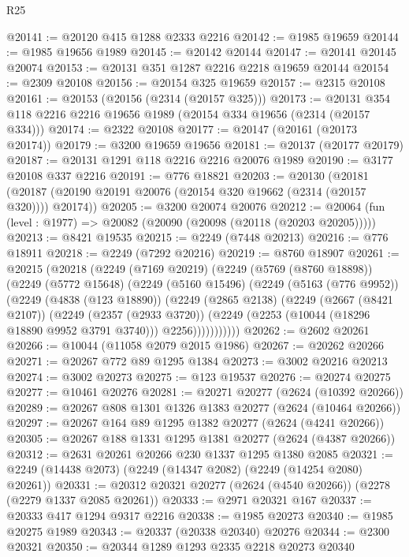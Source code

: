 \begin{lexlean}{R25}
\begin{coremodule}
@20141 := @20120 @415 @1288 @2333 @2216
@20142 := @1985 @19659
@20144 := @1985 @19656 @1989
@20145 := @20142 @20144
@20147 := @20141 @20145 @20074
@20153 := @20131 @351 @1287 @2216 @2218 @19659 @20144
@20154 := @2309 @20108
@20156 := @20154 @325 @19659
@20157 := @2315 @20108
@20161 := @20153 (@20156 (@2314 (@20157 @325)))
@20173 := @20131 @354 @118 @2216 @2216 @19656 @1989 (@20154 @334 @19656 (@2314 (@20157 @334)))
@20174 := @2322 @20108
@20177 := @20147 (@20161 (@20173 @20174))
@20179 := @3200 @19659 @19656
@20181 := @20137 (@20177 @20179)
@20187 := @20131 @1291 @118 @2216 @2216 @20076 @1989
@20190 := @3177 @20108 @337 @2216
@20191 := @776 @18821
@20203 := @20130
    (@20181 (@20187 (@20190 @20191 @20076 (@20154 @320 @19662 (@2314 (@20157 @320)))) @20174))
@20205 := @3200 @20074 @20076
@20212 := @20064 (fun (level : @1977) => @20082 (@20090 (@20098 (@20118 (@20203 @20205)))))
@20213 := @8421 @19535
@20215 := @2249 (@7448 @20213)
@20216 := @776 @18911
@20218 := @2249 (@7292 @20216)
@20219 := @8760 @18907
@20261 := @20215
    (@20218
      (@2249
        (@7169 @20219)
        (@2249
          (@5769 (@8760 @18898))
          (@2249
            (@5772 @15648)
            (@2249
              (@5160 @15496)
              (@2249
                (@5163 (@776 @9952))
                (@2249
                  (@4838 (@123 @18890))
                  (@2249
                    (@2865 @2138)
                    (@2249
                      (@2667 (@8421 @2107))
                      (@2249
                        (@2357 (@2933 @3720))
                        (@2249 (@2253 (@10044 (@18296 @18890 @9952 @3791 @3740))) @2256)))))))))))
@20262 := @2602 @20261
@20266 := @10044 (@11058 @2079 @2015 @1986)
@20267 := @20262 @20266
@20271 := @20267 @772 @89 @1295 @1384
@20273 := @3002 @20216 @20213
@20274 := @3002 @20273
@20275 := @123 @19537
@20276 := @20274 @20275
@20277 := @10461 @20276
@20281 := @20271 @20277 (@2624 (@10392 @20266))
@20289 := @20267 @808 @1301 @1326 @1383 @20277 (@2624 (@10464 @20266))
@20297 := @20267 @164 @89 @1295 @1382 @20277 (@2624 (@4241 @20266))
@20305 := @20267 @188 @1331 @1295 @1381 @20277 (@2624 (@4387 @20266))
@20312 := @2631 @20261 @20266 @230 @1337 @1295 @1380 @2085
@20321 := @2249 (@14438 @2073) (@2249 (@14347 @2082) (@2249 (@14254 @2080) @20261))
@20331 := @20312 @20321 @20277 (@2624 (@4540 @20266)) (@2278 (@2279 @1337 @2085 @20261))
@20333 := @2971 @20321 @167
@20337 := @20333 @417 @1294 @9317 @2216
@20338 := @1985 @20273
@20340 := @1985 @20275 @1989
@20343 := @20337 (@20338 @20340) @20276
@20344 := @2300 @20321
@20350 := @20344 @1289 @1293 @2335 @2218 @20273 @20340

\end{coremodule}
\end{lexlean}
